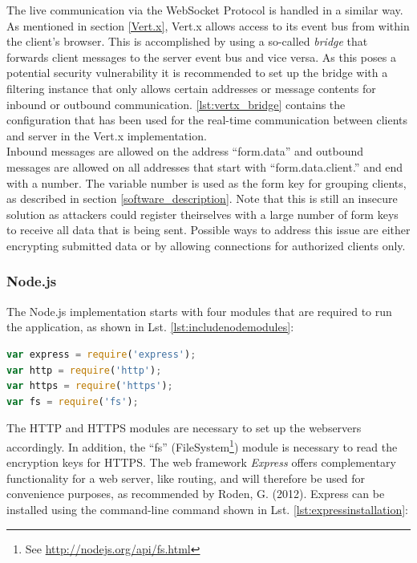 The live communication via the WebSocket Protocol is handled in a similar way. As mentioned in section
\ref{Vert.x}, Vert.x allows access to its event bus from within the client's browser.
This is accomplished by using a so-called \textit{bridge} that forwards client messages to
the server event bus and vice versa. As this poses a potential security vulnerability
it is recommended to set up the bridge with a filtering instance that only allows certain
addresses or message contents for inbound or outbound communication. \autoref{lst:vertx_bridge} contains
the configuration that has been used for the real-time communication between clients
and server in the Vert.x implementation.\\
Inbound messages are allowed on the address ``form.data'' and outbound messages
are allowed on all addresses that start with ``form.data.client.'' and end with a number.
The variable number is used as the form key for grouping clients, as described in section
\ref{software_description}. Note that this is still an insecure solution as attackers
could register theirselves with a large number of form keys to receive all data that
is being sent. Possible ways to address this issue are either encrypting submitted
data or by allowing connections for authorized clients only.




\subsubsection{Node.js}
\label{implementation_node}
The Node.js implementation starts with four modules that are required to run the application, as shown in Lst. \ref{lst:includenodemodules}:

\begin{lstlisting}[language=javascript,caption={Including modules},label=lst:includenodemodules]
var express = require('express');
var http = require('http');
var https = require('https');
var fs = require('fs');
\end{lstlisting}

The HTTP and HTTPS modules are necessary to set up the webservers accordingly. 
In addition, the “fs” (FileSystem\footnote{See \url{ http://nodejs.org/api/fs.html}}) module is necessary to read the encryption keys for HTTPS. The web framework \textit{Express} offers complementary functionality for a web server, like routing, 
and will therefore be used for convenience purposes, as recommended by Roden, G. (2012). 
Express can be installed using the command-line command shown in Lst. \ref{lst:expressinstallation}:\\

